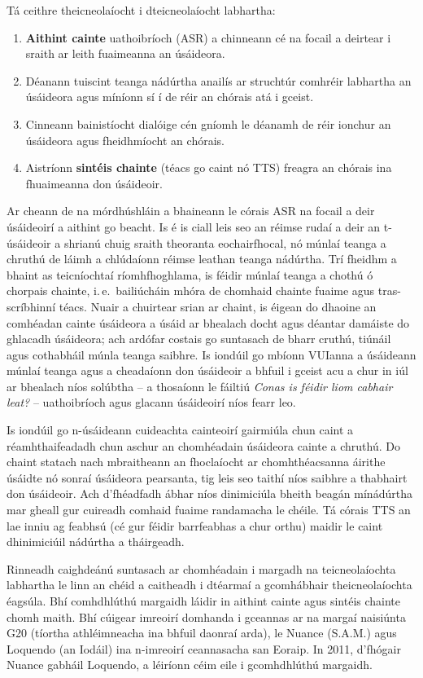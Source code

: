 \begin{multicols}{2}
Tá ceithre theicneolaíocht i dteicneolaíocht labhartha:

\begin{enumerate}
\item \textbf {Aithint cainte} uathoibríoch (ASR) a chinneann cé na focail a deirtear i sraith ar leith fuaimeanna an úsáideora.
\item Déanann tuiscint teanga nádúrtha anailís ar struchtúr comhréir labhartha an úsáideora agus míníonn sí í de réir an chórais atá i gceist.
\item Cinneann bainistíocht dialóige cén gníomh le déanamh de réir ionchur an úsáideora agus fheidhmíocht an chórais.    
\item Aistríonn \textbf{sintéis chainte} (téacs go caint nó TTS) freagra an chórais ina fhuaimeanna don úsáideoir.
\end{enumerate}

Ar cheann de na mórdhúshláin a bhaineann le córais ASR na focail a deir úsáideoirí a aithint go beacht. Is é is ciall leis seo an réimse rudaí a deir an t-úsáideoir a shrianú chuig sraith theoranta eochairfhocal, nó múnlaí teanga a chruthú de láimh a chlúdaíonn réimse leathan teanga nádúrtha. Trí fheidhm a bhaint as teicníochtaí ríomhfhoghlama, is féidir múnlaí teanga a chothú ó chorpais chainte, i.\,e.~bailiúcháin mhóra de chomhaid chainte fuaime agus tras-scríbhinní téacs. Nuair a chuirtear srian ar chaint, is éigean do dhaoine an comhéadan cainte úsáideora a úsáid ar bhealach docht agus déantar damáiste do ghlacadh úsáideora; ach ardófar costais go suntasach de bharr cruthú, tiúnáil agus cothabháil múnla teanga saibhre. Is iondúil go mbíonn VUIanna a úsáideann múnlaí teanga agus a cheadaíonn don úsáideoir a bhfuil i gceist acu a chur in iúl ar bhealach níos solúbtha – a thosaíonn le fáiltiú \textit{Conas is féidir liom cabhair leat?} – uathoibríoch agus glacann úsáideoirí níos fearr leo. 

Is iondúil go n-úsáideann cuideachta cainteoirí gairmiúla chun caint a réamhthaifeadadh chun aschur an chomhéadain úsáideora cainte a chruthú. Do chaint statach nach mbraitheann an fhoclaíocht ar chomhthéacsanna áirithe úsáidte nó sonraí úsáideora pearsanta, tig leis seo taithí níos saibhre a thabhairt don úsáideoir. Ach d’fhéadfadh ábhar níos dinimiciúla bheith beagán mínádúrtha mar gheall gur cuireadh comhaid fuaime randamacha le chéile. Tá córais TTS an lae inniu ag feabhsú (cé gur féidir barrfeabhas a chur orthu) maidir le caint dhinimiciúil nádúrtha a tháirgeadh. 

Rinneadh caighdeánú suntasach ar chomhéadain i margadh na teicneolaíochta labhartha le linn an chéid a caitheadh i dtéarmaí a gcomhábhair theicneolaíochta éagsúla. Bhí comhdhlúthú margaidh láidir in aithint cainte agus sintéis chainte chomh maith. Bhí cúigear imreoirí domhanda i gceannas ar na margaí naisiúnta G20 (tíortha athléimneacha ina bhfuil daonraí arda), le Nuance (S.A.M.) agus Loquendo (an Iodáil) ina n-imreoirí ceannasacha san Eoraip.  In 2011, d’fhógair Nuance gabháil Loquendo, a léiríonn céim eile i gcomhdhlúthú margaidh.


\end{multicols}
